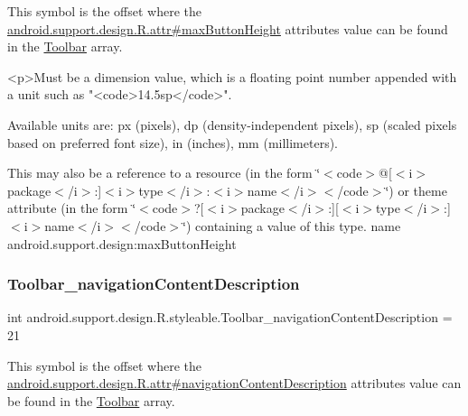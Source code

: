 This symbol is the offset where the \hyperlink{classandroid_1_1support_1_1design_1_1R_1_1attr_ae523ae984ac6bb23a26b52ddf3657fb7}{android.\+support.\+design.\+R.\+attr\#max\+Button\+Height} attribute\textquotesingle{}s value can be found in the \hyperlink{classandroid_1_1support_1_1design_1_1R_1_1styleable_a7783ebe780dbe2a845802a40519a46e9}{Toolbar} array.

\begin{DoxyVerb}      <p>Must be a dimension value, which is a floating point number appended with a unit such as "<code>14.5sp</code>".
\end{DoxyVerb}
 Available units are\+: px (pixels), dp (density-\/independent pixels), sp (scaled pixels based on preferred font size), in (inches), mm (millimeters). 

This may also be a reference to a resource (in the form \char`\"{}$<$code$>$@\mbox{[}$<$i$>$package$<$/i$>$\+:\mbox{]}$<$i$>$type$<$/i$>$\+:$<$i$>$name$<$/i$>$$<$/code$>$\char`\"{}) or theme attribute (in the form \char`\"{}$<$code$>$?\mbox{[}$<$i$>$package$<$/i$>$\+:\mbox{]}\mbox{[}$<$i$>$type$<$/i$>$\+:\mbox{]}$<$i$>$name$<$/i$>$$<$/code$>$\char`\"{}) containing a value of this type.  name android.\+support.\+design\+:max\+Button\+Height \mbox{\label{classandroid_1_1support_1_1design_1_1R_1_1styleable_af072d08cd3f8b67300f7852fec72150c}} 
\subsubsection{\texorpdfstring{Toolbar\+\_\+navigation\+Content\+Description}{Toolbar\_navigationContentDescription}}
{\footnotesize\ttfamily int android.\+support.\+design.\+R.\+styleable.\+Toolbar\+\_\+navigation\+Content\+Description = 21\hspace{0.3cm}{\ttfamily [static]}}

This symbol is the offset where the \hyperlink{classandroid_1_1support_1_1design_1_1R_1_1attr_a26a0680c8c9447209795db42f11f7d95}{android.\+support.\+design.\+R.\+attr\#navigation\+Content\+Description} attribute\textquotesingle{}s value can be found in the \hyperlink{classandroid_1_1support_1_1design_1_1R_1_1styleable_a7783ebe780dbe2a845802a40519a46e9}{Toolbar} array.

